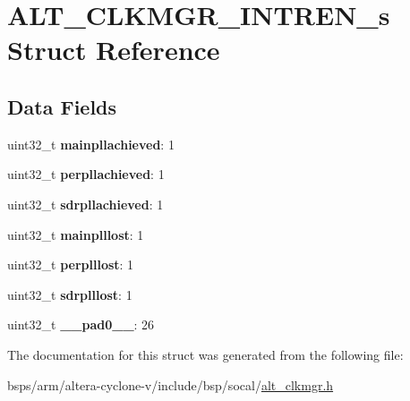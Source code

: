 \hypertarget{structALT__CLKMGR__INTREN__s}{}\section{A\+L\+T\+\_\+\+C\+L\+K\+M\+G\+R\+\_\+\+I\+N\+T\+R\+E\+N\+\_\+s Struct Reference}
\label{structALT__CLKMGR__INTREN__s}
\subsection*{Data Fields}
\begin{DoxyCompactItemize}
\item 
\mbox{\label{structALT__CLKMGR__INTREN__s_ae7990474721cf7485e18b414da8ccc3d}} 
uint32\+\_\+t {\bfseries mainpllachieved}\+: 1
\item 
\mbox{\label{structALT__CLKMGR__INTREN__s_a947064d6701fcac73fca286e4c22ac38}} 
uint32\+\_\+t {\bfseries perpllachieved}\+: 1
\item 
\mbox{\label{structALT__CLKMGR__INTREN__s_a500f2e37466df4566dda02165559afdf}} 
uint32\+\_\+t {\bfseries sdrpllachieved}\+: 1
\item 
\mbox{\label{structALT__CLKMGR__INTREN__s_a2110257e0ed343c3f0443cfdfbbe0f75}} 
uint32\+\_\+t {\bfseries mainplllost}\+: 1
\item 
\mbox{\label{structALT__CLKMGR__INTREN__s_a7bdb3d1efe35763085fef133932711fa}} 
uint32\+\_\+t {\bfseries perplllost}\+: 1
\item 
\mbox{\label{structALT__CLKMGR__INTREN__s_a0a1075c5a9536f47b299297e26c6f6b7}} 
uint32\+\_\+t {\bfseries sdrplllost}\+: 1
\item 
\mbox{\label{structALT__CLKMGR__INTREN__s_a6c50e76005b194f66b5755a8f061c85a}} 
uint32\+\_\+t {\bfseries \+\_\+\+\_\+pad0\+\_\+\+\_\+}\+: 26
\end{DoxyCompactItemize}


The documentation for this struct was generated from the following file\+:\begin{DoxyCompactItemize}
\item 
bsps/arm/altera-\/cyclone-\/v/include/bsp/socal/\mbox{\hyperlink{alt__clkmgr_8h}{alt\+\_\+clkmgr.\+h}}\end{DoxyCompactItemize}
